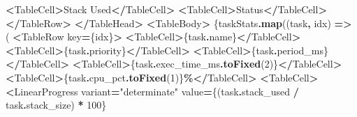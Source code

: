 \documentclass[
]{article}
\newenvironment{Shaded}{\begin{snugshade}}{\end{snugshade}}
\newcommand{\AttributeTok}[1]{\textcolor[rgb]{0.13,0.29,0.53}{#1}}
\newcommand{\DecValTok}[1]{\textcolor[rgb]{0.00,0.00,0.81}{#1}}
\newcommand{\FunctionTok}[1]{\textcolor[rgb]{0.13,0.29,0.53}{\textbf{#1}}}
\newcommand{\KeywordTok}[1]{\textcolor[rgb]{0.13,0.29,0.53}{\textbf{#1}}}
\newcommand{\NormalTok}[1]{#1}
\newcommand{\OperatorTok}[1]{\textcolor[rgb]{0.81,0.36,0.00}{\textbf{#1}}}
\newcommand{\StringTok}[1]{\textcolor[rgb]{0.31,0.60,0.02}{#1}}
\begin{document}
\begin{Shaded}
\begin{Highlighting}[]
                \OperatorTok{\textless{}}\NormalTok{TableCell}\OperatorTok{\textgreater{}}\NormalTok{Stack Used}\OperatorTok{\textless{}/}\NormalTok{TableCell}\OperatorTok{\textgreater{}}
                \OperatorTok{\textless{}}\NormalTok{TableCell}\OperatorTok{\textgreater{}}\NormalTok{Status}\OperatorTok{\textless{}/}\NormalTok{TableCell}\OperatorTok{\textgreater{}}
              \OperatorTok{\textless{}/}\NormalTok{TableRow}\OperatorTok{\textgreater{}}
            \OperatorTok{\textless{}/}\NormalTok{TableHead}\OperatorTok{\textgreater{}}
            \OperatorTok{\textless{}}\NormalTok{TableBody}\OperatorTok{\textgreater{}}
\NormalTok{              \{taskStats}\OperatorTok{.}\FunctionTok{map}\NormalTok{((task}\OperatorTok{,}\NormalTok{ idx) }\KeywordTok{=\textgreater{}}\NormalTok{ (}
                \OperatorTok{\textless{}}\NormalTok{TableRow key}\OperatorTok{=}\NormalTok{\{idx\}}\OperatorTok{\textgreater{}}
                  \OperatorTok{\textless{}}\NormalTok{TableCell}\OperatorTok{\textgreater{}}\NormalTok{\{task}\OperatorTok{.}\AttributeTok{name}\NormalTok{\}}\OperatorTok{\textless{}/}\NormalTok{TableCell}\OperatorTok{\textgreater{}}
                  \OperatorTok{\textless{}}\NormalTok{TableCell}\OperatorTok{\textgreater{}}\NormalTok{\{task}\OperatorTok{.}\AttributeTok{priority}\NormalTok{\}}\OperatorTok{\textless{}/}\NormalTok{TableCell}\OperatorTok{\textgreater{}}
                  \OperatorTok{\textless{}}\NormalTok{TableCell}\OperatorTok{\textgreater{}}\NormalTok{\{task}\OperatorTok{.}\AttributeTok{period\_ms}\NormalTok{\}}\OperatorTok{\textless{}/}\NormalTok{TableCell}\OperatorTok{\textgreater{}}
                  \OperatorTok{\textless{}}\NormalTok{TableCell}\OperatorTok{\textgreater{}}\NormalTok{\{task}\OperatorTok{.}\AttributeTok{exec\_time\_ms}\OperatorTok{.}\FunctionTok{toFixed}\NormalTok{(}\DecValTok{2}\NormalTok{)\}}\OperatorTok{\textless{}/}\NormalTok{TableCell}\OperatorTok{\textgreater{}}
                  \OperatorTok{\textless{}}\NormalTok{TableCell}\OperatorTok{\textgreater{}}\NormalTok{\{task}\OperatorTok{.}\AttributeTok{cpu\_pct}\OperatorTok{.}\FunctionTok{toFixed}\NormalTok{(}\DecValTok{1}\NormalTok{)\}}\OperatorTok{\%\textless{}/}\NormalTok{TableCell}\OperatorTok{\textgreater{}}
                  \OperatorTok{\textless{}}\NormalTok{TableCell}\OperatorTok{\textgreater{}}
                    \OperatorTok{\textless{}}\NormalTok{LinearProgress}
\NormalTok{                      variant}\OperatorTok{=}\StringTok{"determinate"}
\NormalTok{                      value}\OperatorTok{=}\NormalTok{\{(task}\OperatorTok{.}\AttributeTok{stack\_used} \OperatorTok{/}\NormalTok{ task}\OperatorTok{.}\AttributeTok{stack\_size}\NormalTok{) }\OperatorTok{*} \DecValTok{100}\NormalTok{\}}

\end{Highlighting}
\end{Shaded}
\end{document}
